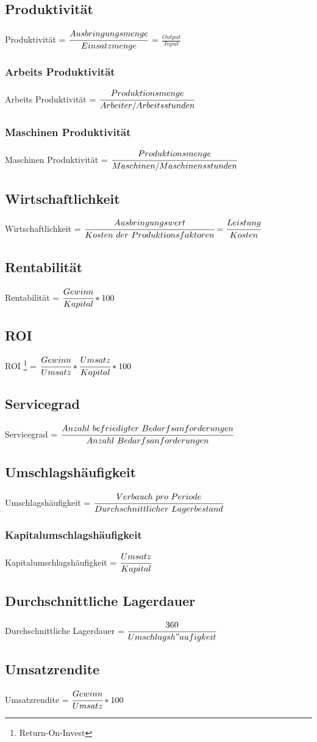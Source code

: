 \documentclass[a4paper,12pt]{scrartcl}
\begin{document}
\subsection{Produktivität}
Produktivität = $\cfrac{Ausbringungsmenge}{Einsatzmenge}$ = $\frac{Output}{Input}$ 
\subsubsection{Arbeits Produktivität}
Arbeits Produktivität = $\cfrac{Produktionsmenge}{Arbeiter/Arbeitsstunden}$
\subsubsection{Maschinen Produktivität}
Maschinen Produktivität = $\cfrac{Produktionsmenge}{Maschinen/Maschinensstunden}$

\subsection{Wirtschaftlichkeit}
Wirtschaftlichkeit = $\cfrac{Ausbringungswert}{Kosten~der~Produktionsfaktoren} = \cfrac{Leistung}{Kosten}$ 

\subsection{Rentabilität} 
Rentabilität = $\cfrac{Gewinn}{Kapital} * 100$ 

\subsection{ROI} 
ROI \footnote{Return-On-Invest} = $\cfrac{Gewinn}{Umsatz} * \cfrac{Umsatz}{Kapital} * 100$ 

\subsection{Servicegrad} 
Servicegrad = $\cfrac{Anzahl~befriedigter~Bedarfsanforderungen}{Anzahl~Bedarfsanforderungen}$ 


\subsection{Umschlagshäufigkeit}
Umschlagshäufigkeit = $\cfrac{Verbauch~pro~Periode}{Durchschnittlicher~Lagerbestand}$
\subsubsection{Kapitalumschlagshäufigkeit}
Kapitalumschlagshäufigkeit = $\cfrac{Umsatz}{Kapital}$

\subsection{Durchschnittliche Lagerdauer} 
Durchschnittliche Lagerdauer = $\cfrac{360}{Umschlagsh"aufigkeit}$ 

\subsection{Umsatzrendite} 
Umsatzrendite = $\cfrac{Gewinn}{Umsatz} * 100$ 
\end{document}
